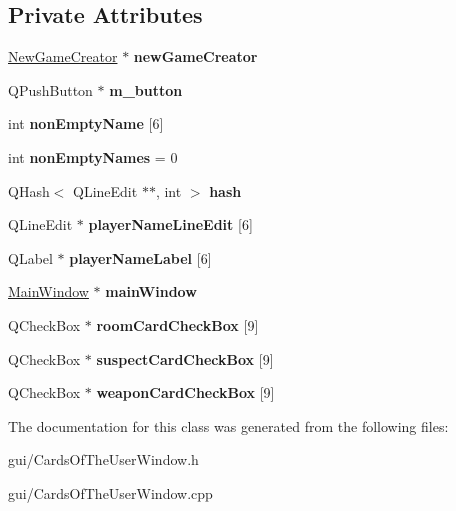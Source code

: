 \subsection*{Private Attributes}
\begin{DoxyCompactItemize}
\item 
\mbox{\label{classCardsOfTheUserWindow_a073a7e94b3228231fcc3b3441080beda}} 
\hyperlink{classNewGameCreator}{New\+Game\+Creator} $\ast$ {\bfseries new\+Game\+Creator}
\item 
\mbox{\label{classCardsOfTheUserWindow_a193d8c12dbb1a86990c0ffa540f0e22b}} 
Q\+Push\+Button $\ast$ {\bfseries m\+\_\+button}
\item 
\mbox{\label{classCardsOfTheUserWindow_a7749950256a9dae35f588edbda24dfed}} 
int {\bfseries non\+Empty\+Name} \mbox{[}6\mbox{]}
\item 
\mbox{\label{classCardsOfTheUserWindow_a27da8d2c5f07e25aadc9efaa1f337ca4}} 
int {\bfseries non\+Empty\+Names} = 0
\item 
\mbox{\label{classCardsOfTheUserWindow_a19737c0ee4e534caa29a783363691c95}} 
Q\+Hash$<$ Q\+Line\+Edit $\ast$$\ast$, int $>$ {\bfseries hash}
\item 
\mbox{\label{classCardsOfTheUserWindow_a804849fb06aeaca668d23aeb51b7fd68}} 
Q\+Line\+Edit $\ast$ {\bfseries player\+Name\+Line\+Edit} \mbox{[}6\mbox{]}
\item 
\mbox{\label{classCardsOfTheUserWindow_aaaeca66bf494c89d062ba58b342b9bfa}} 
Q\+Label $\ast$ {\bfseries player\+Name\+Label} \mbox{[}6\mbox{]}
\item 
\mbox{\label{classCardsOfTheUserWindow_ae5f218228388f66a7aa41f00480cf3d0}} 
\hyperlink{classMainWindow}{Main\+Window} $\ast$ {\bfseries main\+Window}
\item 
\mbox{\label{classCardsOfTheUserWindow_ad0c31cbf8f794712299523fefa80a0ca}} 
Q\+Check\+Box $\ast$ {\bfseries room\+Card\+Check\+Box} \mbox{[}9\mbox{]}
\item 
\mbox{\label{classCardsOfTheUserWindow_a1ca9d407f2fc2026a8fa59c3a2cd520c}} 
Q\+Check\+Box $\ast$ {\bfseries suspect\+Card\+Check\+Box} \mbox{[}9\mbox{]}
\item 
\mbox{\label{classCardsOfTheUserWindow_a01716e974d04e846dd16af85b9856391}} 
Q\+Check\+Box $\ast$ {\bfseries weapon\+Card\+Check\+Box} \mbox{[}9\mbox{]}
\end{DoxyCompactItemize}


The documentation for this class was generated from the following files\+:\begin{DoxyCompactItemize}
\item 
gui/Cards\+Of\+The\+User\+Window.\+h\item 
gui/Cards\+Of\+The\+User\+Window.\+cpp\end{DoxyCompactItemize}

